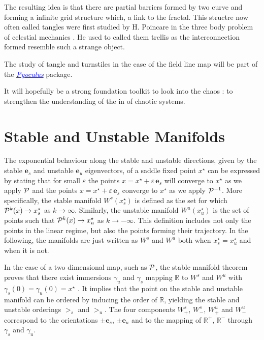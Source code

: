 The resulting idea is that there are partial barriers formed by two curve and forming a infinite grid structure which, a link to the fractal. This structre now often called tangles were first studied by H. Poincare in the three body problem of celestial mechanics \cite{poincare_methodes_1899}. He used to called them trellis as the interconnection formed resemble such a strange object.

The study of tangle and turnstiles in the case of the field line map will be part of the \href{https://github.com/zhisong/pyoculus}{\textcolor{blue}{\textit{Pyoculus}}} package.

It will hopefully be a strong foundation toolkit to look into the chaos : to strengthen the understanding of the in of chaotic systems.

\section{Stable and Unstable Manifolds}\label{sec:manif}

The exponential behaviour along the stable and unstable directions, given by the stable $\textbf{e}_s$ and unstable $\textbf{e}_u$ eigenvectors, of a saddle fixed point $x^\star$ can be expressed by stating that for small $\varepsilon$ the points $x = x^\star + \varepsilon\,\textbf{e}_s$ will converge to $x^\star$ as we apply $\mathcal{P}$ and the points $x = x^\star + \varepsilon\,\textbf{e}_s$ converge to $x^\star$ as we apply $\mathcal{P}^{-1}$. More specifically, the stable manifold $W^s(x_s^\star)$ is defined as the set for which $\mathcal{P}^k(x)\to x_s^\star$ as $k\to\infty$. Similarly, the unstable manifold $W^u(x_u^\star)$ is the set of points such that $\mathcal{P}^k(x)\to x_u^\star$ as $k\to -\infty$. This definition includes not only the points in the linear regime, but also the points forming their trajectory. In the following, the manifolds are just written as $W^s$ and $W^u$ both when $x_s^\star = x_u^\star$ and when it is not.

In the case of a two dimensional map, such as $\mathcal{P}$, the stable manifold theorem proves that there exist immersions $\gamma_u$ and $\gamma_s$ mapping $\mathbb{R}$ to $W^s$ and $W^u$ with $\gamma_s(0) = \gamma_u(0) = x^\star$ \cite{easton_trellises_1986}. It implies that the point on the stable and unstable manifold can be ordered by inducing the order of $\mathbb{R}$, yielding the stable and unstable orderings $>_s$ and $>_u$. The four components $W_+^s$, $W_-^s$, $W_+^u$ and $W_-^u$ correspond to the orientations $\pm\textbf{e}_s$, $\pm\textbf{e}_u$ and to the mapping of $\mathbb{R}^+$, $\mathbb{R}^-$ through $\gamma_s$ and $\gamma_u$.


